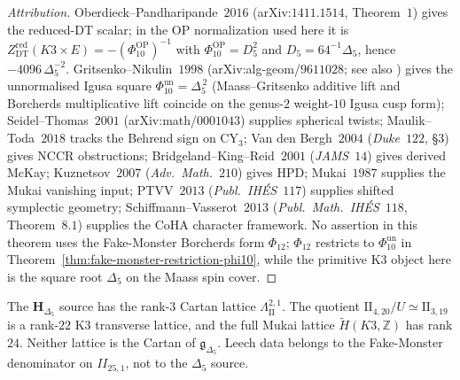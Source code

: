 \begin{proof}[Attribution]
Oberdieck--Pandharipande~$2016$ (arXiv:$1411.1514$, Theorem~$1$) gives the
reduced-DT scalar; in the OP normalization used here it is
\(Z^{\mathrm{red}}_{\mathrm{DT}}(K3 \times E)=-(\Phi_{10}^{\mathrm{OP}})^{-1}\)
with \(\Phi_{10}^{\mathrm{OP}}=D_5^2\) and \(D_5=64^{-1}\Delta_5\), hence
\(-4096\,\Delta_5^{-2}\). Gritsenko--Nikulin~$1998$
(arXiv:alg-geom/$9611028$; see also \cite{GritsenkoNikulin1998}) gives
the unnormalised Igusa square \(\Phi_{10}^{\mathrm{un}}=\Delta_5^{\,2}\)
(Maass--Gritsenko additive lift and Borcherds multiplicative lift coincide
on the genus-$2$ weight-$10$ Igusa cusp form); Seidel--Thomas~$2001$
(arXiv:math/$0001043$) supplies spherical twists; Maulik--Toda~$2018$
tracks the Behrend sign on CY$_3$; Van den Bergh~$2004$ (\emph{Duke}~$122$,
\S$3$) gives NCCR obstructions; Bridgeland--King--Reid~$2001$
(\emph{JAMS}~$14$) gives derived McKay; Kuznetsov~$2007$
(\emph{Adv.\ Math.}~$210$) gives HPD; Mukai~$1987$ supplies the Mukai
vanishing input; PTVV~$2013$ (\emph{Publ.\ IH\'ES}~$117$) supplies shifted
symplectic geometry; Schiffmann--Vasserot~$2013$ (\emph{Publ.\ Math.\
IH\'ES}~$118$, Theorem~$8.1$) supplies the CoHA character framework. No
assertion in this theorem uses the Fake-Monster Borcherds form
\(\Phi_{12}\); \(\Phi_{12}\) restricts to \(\Phi_{10}^{\mathrm{un}}\) in
Theorem~\ref{thm:fake-monster-restriction-phi10}, while the primitive K3
object here is the square root \(\Delta_5\) on the Maass spin cover.
\end{proof}

\begin{remark}[Cartan rank of the \texorpdfstring{$\Delta_5$}{Delta5} source]
\label{rem:k3-chiral-bialgebra-rank-23-cartan}
The $\mathbf{H}_{\Delta_5}$ source has the rank-$3$ Cartan lattice
$\Lambda^{2,1}_{\mathrm{II}}$. The quotient
$\mathrm{II}_{4,20}/U\simeq\mathrm{II}_{3,19}$ is a rank-$22$ K3
transverse lattice, and the full Mukai lattice
$\widetilde H(K3,\mathbb Z)$ has rank $24$. Neither lattice is the
Cartan of $\mathfrak g_{\Delta_5}$. Leech data belongs to the
Fake-Monster denominator on $II_{25,1}$, not to the $\Delta_5$ source.
\end{remark}

